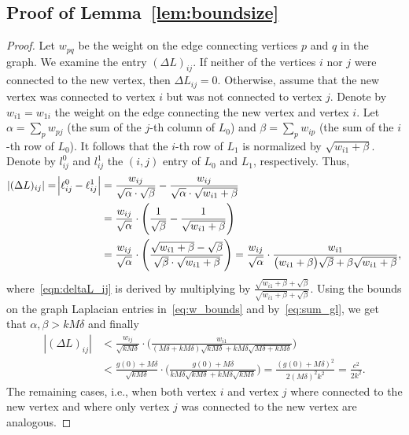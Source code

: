 \documentclass[11pt]{article}
\begin{document}
\subsection{Proof of Lemma~\ref{lem:boundsize}} \label{sec:ProofOfLemmaBoundSize}
\begin{proof}

Let $w_{pq}$ be the weight on the edge connecting vertices $p$ and $q$ in the graph. We examine the entry $(\Delta L)_{ij}$. If neither of the vertices $i$ nor $j$ were connected to the new vertex, then $\Delta L_{ij} = 0$. Otherwise, assume that the new vertex was connected to vertex $i$ but was not connected to vertex $j$. Denote by $w_{i1} = w_{1i}$ the weight on the edge connecting the new vertex and vertex $i$. Let $\alpha = \sum_p w_{pj}$ (the sum of the $j$-th column of $L_0$) and $\beta = \sum_p w_{ip}$ (the sum of the $i$-th row of $L_0$). It follows that the $i$-th row of $L_1$ is normalized by $\sqrt{w_{i1} + \beta}$. Denote by $l^0_{ij}$ and $l^1_{ij}$ the $(i,j)$ entry of $L_0$ and $L_1$, respectively. Thus,
\begin{equation} \label{eqn:deltaL_ij}
\begin{split}
|(\Delta L)_{ij}|  = \abs{\ell^0_{ij} - \ell^1_{ij}}  & = \frac{w_{ij}}{\sqrt{\alpha} \cdot \sqrt{\beta}} - \frac{w_{ij}}{\sqrt{\alpha} \cdot \sqrt{w_{i1} + \beta}} \\
& = \frac{w_{ij}}{\sqrt{\alpha}} \cdot \Bigg( \frac{1}{\sqrt{\beta}} - \frac{1}{\sqrt{w_{i1} + \beta}} \Bigg)  \\
& = \frac{w_{ij}}{\sqrt{\alpha}} \cdot \Bigg( \frac{\sqrt{w_{i1} + \beta} - \sqrt{\beta}}{\sqrt{\beta} \cdot \sqrt{w_{i1} + \beta}} \Bigg)  = \frac{w_{ij}}{\sqrt{\alpha}} \cdot \frac{w_{i1}}{\big(w_{i1} + \beta\big)\sqrt{\beta} + \beta\sqrt{w_{i1} + \beta}},
\end{split} 
\end{equation}
where~\eqref{eqn:deltaL_ij} is derived by multiplying by $\frac{\sqrt{w_{i1} + \beta} + \sqrt{\beta}}{\sqrt{w_{i1} + \beta} + \sqrt{\beta}}$. Using the bounds on the graph Laplacian entries in~\eqref{eq:w_bounds} and by~\eqref{eq:sum_gl}, we get that $\alpha,\beta > kM\delta$ and finally
\begin{equation}
\begin{split}
|(\Delta L)_{ij}| & < \frac{w_{ij}}{\sqrt{kM\delta}} \cdot \Bigg( \frac{w_{i1}}{(M\delta + kM\delta) \sqrt{kM\delta} + kM\delta \sqrt{M\delta + kM\delta}} \Bigg) \\
                      & < \frac{g(0) + M \delta}{\sqrt{kM\delta}} \cdot \Bigg( \frac{g(0) + M \delta}{kM\delta \sqrt{kM\delta}  + kM\delta \sqrt{kM\delta}} \Bigg) = \frac{(g(0) + M \delta)^2}{2(M\delta)^2 k^2} = \frac{c^2}{2k^2} .
\end{split}
\end{equation}
\noindent
The remaining cases, i.e., when both vertex $i$ and vertex $j$ where connected to the new vertex and where only vertex $j$ was connected to the new vertex are analogous.

\end{proof}
\end{document}
